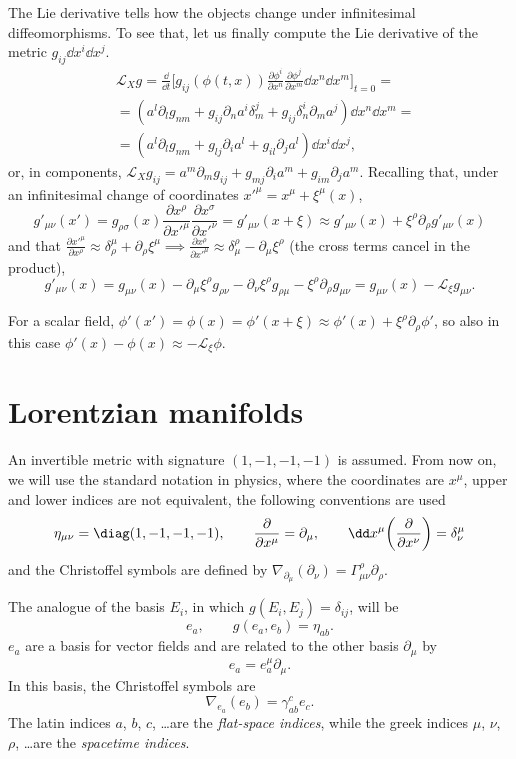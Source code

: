 \documentclass[a4paper,12pt]{book}
\begin{document}
The Lie derivative tells how the objects change under infinitesimal diffeomorphisms. To see that, let us finally compute the Lie derivative of the metric $g_{ij}\dd x^i\dd x^j$.
\begin{align*}
&\mathcal L_Xg=\frac{\dd}{\dd t}\biggl[g_{ij}(\phi(t,x))\frac{\partial\phi^i}{\partial x^n}\frac{\partial\phi^j}{\partial x^m}\dd x^n\dd x^m\biggr]_{t=0}=\\
&=(a^l\partial_lg_{nm}+g_{ij}\partial_na^i\delta_m^j+g_{ij}\delta_n^i\partial_ma^j)\dd x^n\dd x^m=\\
&=(a^l\partial_lg_{nm}+g_{lj}\partial_ia^l+g_{il}\partial_ja^l)\dd x^i\dd x^j,
\end{align*}
or, in components, $\mathcal L_Xg_{ij}=a^m\partial_mg_{ij}+g_{mj}\partial_ia^m+g_{im}\partial_ja^m$. Recalling that, under an infinitesimal change of coordinates $x'^\mu=x^\mu+\xi^\mu(x)$,
\[g'_{\mu\nu}(x')=g_{\rho\sigma}(x)\frac{\partial x^\rho}{\partial x'^\mu}\frac{\partial x^\sigma}{\partial x'^\nu}=g'_{\mu\nu}(x+\xi)\approx g'_{\mu\nu}(x)+\xi^\rho\partial_\rho g'_{\mu\nu}(x)\]
and that $\frac{\partial x'^\mu}{\partial x^\rho}\approx\delta_\rho^\mu+\partial_\rho\xi^\mu\implies \frac{\partial x^\rho}{\partial x'^\mu}\approx\delta^\rho_\mu-\partial_\mu\xi^\rho$ (the cross terms cancel in the product),
\[g'_{\mu\nu}(x)=g_{\mu\nu}(x)-\partial_\mu\xi^\rho g_{\rho\nu}-\partial_\nu \xi^\rho g_{\rho\mu}-\xi^\rho\partial_\rho g_{\mu\nu}=g_{\mu\nu}(x)-\mathcal L_\xi g_{\mu\nu}.\]

For a scalar field, $\phi'(x')=\phi(x)=\phi'(x+\xi)\approx\phi'(x)+\xi^\rho\partial_\rho\phi'$, so also in this case $\phi'(x)-\phi(x)\approx-\mathcal L_\xi\phi$.

\section{Lorentzian manifolds}

An invertible metric with signature $(1,-1,-1,-1)$ is assumed. From now on, we will use the standard notation in physics, where the coordinates are $x^\mu$, upper and lower indices are not equivalent, the following conventions are used
\[\eta_{\mu\nu}=\diag(1,-1,-1,-1),\qquad \frac{\partial}{\partial x^\mu}=\partial_\mu,\qquad \dd x^\mu\biggl(\frac{\partial}{\partial x^\nu}\biggr)=\delta^\mu_\nu\]
and the Christoffel symbols are defined by $\nabla_{\partial_\mu}(\partial_\nu)=\Gamma_{\mu\nu}^\rho\partial_\rho$.

The analogue of the basis $E_i$, in which $g(E_i,E_j)=\delta_{ij}$, will be
\[e_a,\qquad g(e_a,e_b)=\eta_{ab}.\]
$e_a$ are a basis for vector fields and are related to the other basis $\partial_\mu$ by
\[e_a=e_a^\mu\partial_\mu.\]
In this basis, the Christoffel symbols are
\[\nabla_{e_a}(e_b)=\gamma_{ab}^ce_c.\]
The latin indices $a$, $b$, $c$, \ldots are the \emph{flat-space indices}, while the greek indices $\mu$, $\nu$, $\rho$, \ldots are the \emph{spacetime indices}.
\end{document}

